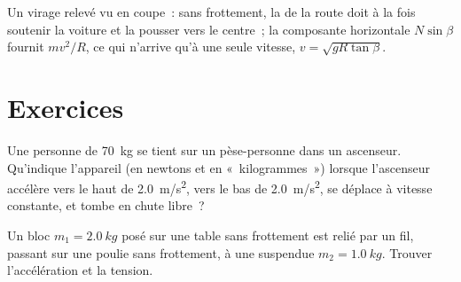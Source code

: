 \begin{omfigure}

{\small Un virage relevé vu en coupe~: sans frottement, la  de la route doit à la fois soutenir la voiture et la pousser
vers le centre~; la composante horizontale $N\sin\beta$ fournit
$mv^2/R$, ce qui n'arrive qu'à une seule vitesse,
$v = \sqrt{gR\tan\beta}$.}
\end{omfigure}

\section{Exercices}

\begin{exercise}[$\star$]\label{exo:b1:newton-dynamics:1}
Une personne de \qty{70}{kg} se tient sur un pèse-personne dans un
ascenseur. Qu'indique l'appareil (en newtons et en «~kilogrammes~»)
lorsque l'ascenseur accélère vers le haut de \qty{2.0}{m/s^2}, vers le
bas de \qty{2.0}{m/s^2}, se déplace à vitesse constante, et tombe en
chute libre~?
\end{exercise}

\begin{exercise}[$\star$]\label{exo:b1:newton-dynamics:2}
Un bloc $m_1 = \qty{2.0}{kg}$ posé sur une table sans frottement est
relié par un fil, passant sur une poulie sans frottement, à une 
suspendue $m_2 = \qty{1.0}{kg}$. Trouver l'accélération et la tension.
\end{exercise}

